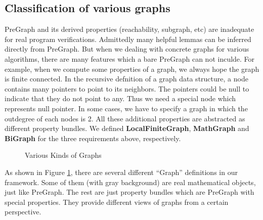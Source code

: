 \subsection{Classification of various graphs}

PreGraph and its derived properties (reachability, subgraph, etc) are
inadequate for real program verifications. Admittedly many helpful
lemmas can be inferred directly from PreGraph. But when we dealing
with concrete graphs for various algorithms, there are many features
which a bare PreGraph can not inculde. For example, when we compute
some properties of a graph, we always hope the graph is finite
connected. In the recursive defnition of a graph data structure, a
node contains many pointers to point to its neighbors. The pointers
could be null to indicate that they do not point to any. Thus we need
a special node which represents null pointer. In some cases, we have
to specify a graph in which the outdegree of each nodes is 2. All
these additional properties are abstracted as different property
bundles. We defined \textbf{LocalFiniteGraph}, \textbf{MathGraph}
and \textbf{BiGraph} for the three requirements above,
respectively.

\begin{figure}[htbp]
\centering
{}
\caption{Various Kinds of Graphs}\label{fig:graphs}
\end{figure}

As shown in Figure \ref{fig:graphs}, there are several different
``Graph'' definitions in our framework. Some of them (with gray
background) are real mathematical objects, just like PreGraph. The
rest are just property bundles which are PreGraph with special
properties. They provide different views of graphs from a certain
perspective.

